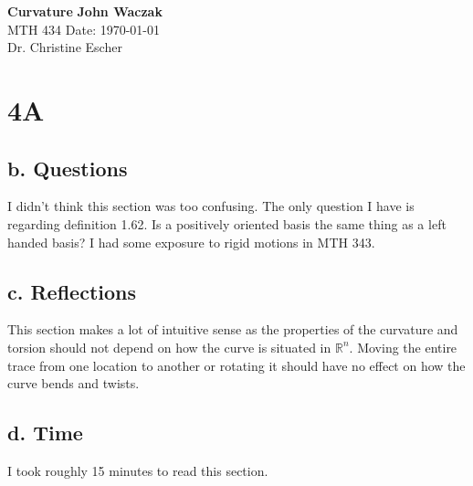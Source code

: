 \documentclass[a4paper, 11pt]{article}
\begin{document}
\noindent
\large\textbf{Curvature} \hfill \textbf{John Waczak} \\
\normalsize MTH 434 \hfill  Date: \today \\
Dr. Christine Escher \\

\section*{4A}
	\subsection*{b. Questions}
	I didn't think this section was too confusing. The only question I have is regarding definition 1.62. Is a positively oriented basis the same thing as a left handed basis? I had some exposure to rigid motions in MTH 343. 
	\subsection*{c. Reflections}
	This section makes a lot of intuitive sense as the properties of the curvature and torsion should not depend on how the curve is situated in $\mathbb{R}^n$. Moving the entire trace from one location to another or rotating it should have no effect on how the curve bends and twists. 
	
	\subsection*{d. Time}
	I took roughly 15 minutes to read this section. 
\end{document}

